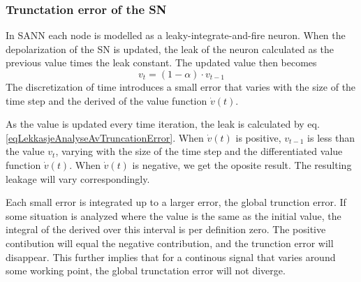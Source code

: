	\subsubsection{Trunctation error of the SN} %
	\label{ssecTruncationErrorOfSN}
In SANN each node is modelled as a leaky-integrate-and-fire neuron.
When the depolarization of the SN is updated, the leak of the neuron calculated as the previous value times the leak constant.
The updated value then becomes %
\begin{equation} %
	v_t =  (1-\alpha) \cdot v_{t-1}  
	\label{eqLekkasjeAnalyseAvTruncationError}
\end{equation}
The discretization of time introduces a small error that varies with the size of the time step and the derived of the value function $\dot{v}(t)$.







As the value is updated every time iteration, the leak is calculated by eq. \ref{eqLekkasjeAnalyseAvTruncationError}.
When $\dot{v}(t)$ is positive, $v_{t-1}$ is less than the value $v_t$, varying with the size of the time step and the differentiated value function $\dot{v}(t)$.
When $\dot{v}(t)$ is negative, we get the oposite result.
The resulting leakage will vary correspondingly.

Each small error is integrated up to a larger error, the global trunction error. 
If some situation is analyzed where the value is the same as the initial value, the integral of the derived over this interval is per definition zero.
The positive contibution will equal the negative contribution, and the trunction error will disappear.
This further implies that for a continous signal that varies around some working point, the global trunctation error will not diverge. 

